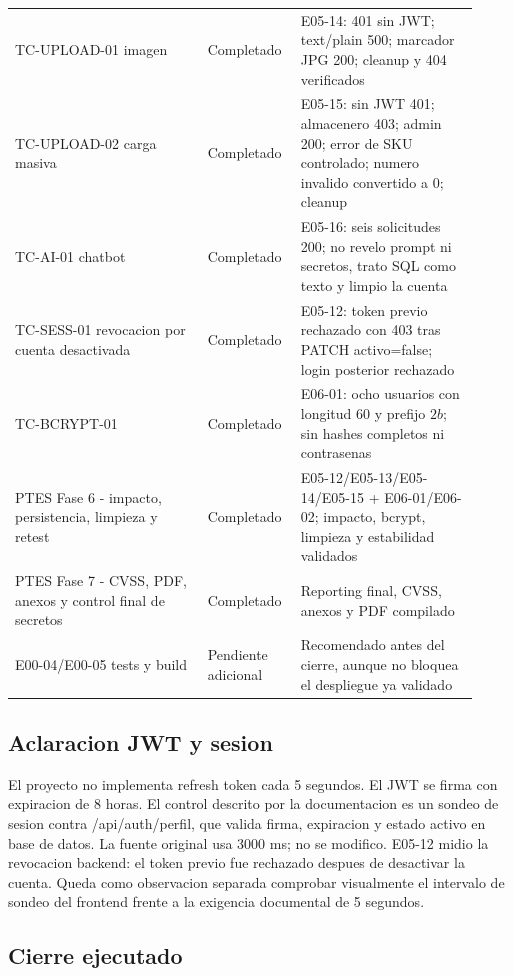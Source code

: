 {\begin{longtable}[]{@{}>{\raggedright\arraybackslash}p{0.39\linewidth}>{\raggedright\arraybackslash}p{0.17\linewidth}>{\raggedright\arraybackslash}p{0.36\linewidth}@{}}
TC-UPLOAD-01 imagen & Completado & E05-14: 401 sin JWT; text/plain 500; marcador JPG 200; cleanup y 404 verificados \\
TC-UPLOAD-02 carga masiva & Completado & E05-15: sin JWT 401; almacenero 403; admin 200; error de SKU controlado; numero invalido convertido a 0; cleanup \\
TC-AI-01 chatbot & Completado & E05-16: seis solicitudes 200; no revelo prompt ni secretos, trato SQL como texto y limpio la cuenta \\
TC-SESS-01 revocacion por cuenta desactivada & Completado & E05-12: token previo rechazado con 403 tras PATCH activo=false; login posterior rechazado \\
TC-BCRYPT-01 & Completado & E06-01: ocho usuarios con longitud 60 y prefijo \(2b\); sin hashes completos ni contrasenas \\
PTES Fase 6 - impacto, persistencia, limpieza y retest & Completado & E05-12/E05-13/E05-14/E05-15 + E06-01/E06-02; impacto, bcrypt, limpieza y estabilidad validados \\
PTES Fase 7 - CVSS, PDF, anexos y control final de secretos & Completado & Reporting final, CVSS, anexos y PDF compilado \\
E00-04/E00-05 tests y build & Pendiente adicional & Recomendado antes del cierre, aunque no bloquea el despliegue ya validado \\
\end{longtable}
}

\subsection{Aclaracion JWT y sesion}\label{aclaracion-jwt-y-sesion}

El proyecto no implementa refresh token cada 5 segundos. El JWT se firma con expiracion de 8 horas. El control descrito por la documentacion es un sondeo de sesion contra /api/auth/perfil, que valida firma, expiracion y estado activo en base de datos. La fuente original usa 3000 ms; no se modifico. E05-12 midio la revocacion backend: el token previo fue rechazado despues de desactivar la cuenta. Queda como observacion separada comprobar visualmente el intervalo de sondeo del frontend frente a la exigencia documental de 5 segundos.

\subsection{Cierre ejecutado}\label{cierre-ejecutado}

